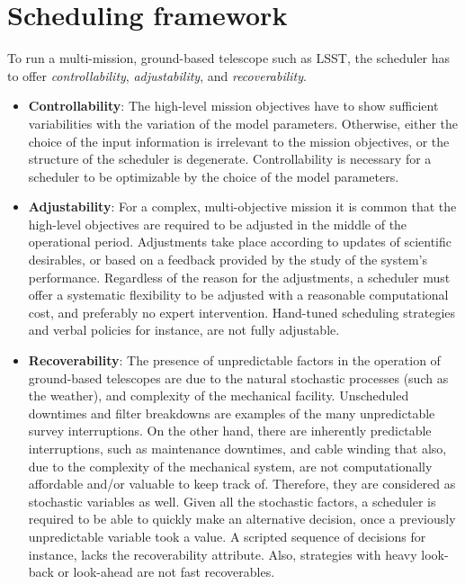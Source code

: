 \documentclass[12pt]{aastex62}
\theoremstyle{definition}
\begin{document}
\section{Scheduling framework}\label{sec_SM}
To run a multi-mission, ground-based telescope such as LSST, the scheduler has to offer \textit{controllability}, \textit{adjustability}, and \textit{recoverability}.
\begin{itemize}
\item \textbf{Controllability}: The high-level mission objectives have to show sufficient variabilities with the variation of the model parameters. Otherwise, either the choice of the input  information is irrelevant to the mission objectives, or the structure of the scheduler is degenerate. Controllability is necessary for a scheduler to be optimizable by the choice of the model parameters. 
\item \textbf{Adjustability}: For a complex, multi-objective mission it is common that the high-level objectives are required to be adjusted in the middle of the operational period. Adjustments take place according to updates of scientific desirables, or based on a feedback provided by the study of the system's performance. Regardless of the reason for the adjustments, a scheduler must offer a systematic flexibility to be adjusted with a reasonable computational cost, and preferably no expert intervention. Hand-tuned scheduling strategies and verbal policies for instance, are not fully adjustable.
\item \textbf{Recoverability}: The presence of unpredictable factors in the operation of ground-based telescopes are due to the natural stochastic processes (such as the weather), and complexity of the mechanical facility. Unscheduled downtimes and filter breakdowns are examples of the many unpredictable survey interruptions. On the other hand, there are inherently predictable interruptions, such as maintenance downtimes, and cable winding that also, due to the complexity of the mechanical system, are not computationally affordable and/or valuable to keep track of. Therefore, they are considered as stochastic variables as well. Given all the stochastic factors, a scheduler is required to be able to quickly make an alternative decision, once a previously unpredictable variable took a value. A scripted sequence of decisions for instance, lacks the recoverability attribute. Also, strategies with heavy look-back or look-ahead are not fast recoverables. 
\end{itemize}
\end{document}
